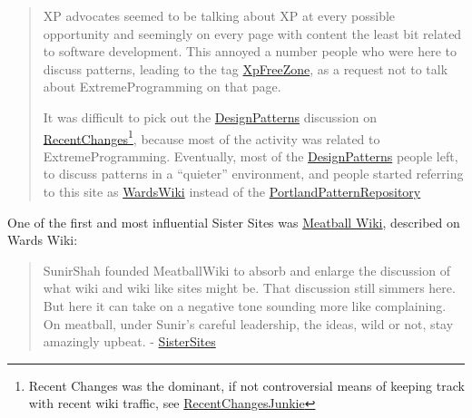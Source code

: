 \documentclass[notoc]{tufte-book}
\begin{document}
\begin{quote}
XP advocates seemed to be talking about XP at every possible opportunity
and seemingly on every page with content the least bit related to
software development. This annoyed a number people who were here to
discuss patterns, leading to the tag
\href{http://wiki.c2.com/?XpFreeZone}{XpFreeZone}, as a request not to
talk about ExtremeProgramming on that page.

It was difficult to pick out the
\href{http://wiki.c2.com/?DesignPatterns}{DesignPatterns} discussion on
\href{http://wiki.c2.com/?RecentChanges}{RecentChanges}\footnote{Recent
  Changes was the dominant, if not controversial means of keeping track
  with recent wiki traffic, see
  \href{http://wiki.c2.com/?RecentChangesJunkie}{RecentChangesJunkie}},
because most of the activity was related to ExtremeProgramming.
Eventually, most of the
\href{http://wiki.c2.com/?DesignPatterns}{DesignPatterns} people left,
to discuss patterns in a ``quieter'' environment, and people started
referring to this site as
\href{http://wiki.c2.com/?WardsWiki}{WardsWiki} instead of the
\href{http://wiki.c2.com/?PortlandPatternRepository}{PortlandPatternRepository}
\citep{C2wikiWikiHistory} 
\end{quote}

One of the first and most influential Sister Sites was
\href{http://meatballwiki.org/}{Meatball Wiki}, described on Wards Wiki:

\begin{quote}
SunirShah founded MeatballWiki to absorb and enlarge the discussion of
what wiki and wiki like sites might be. That discussion still simmers
here. But here it can take on a negative tone sounding more like
complaining. On meatball, under Sunir's careful leadership, the ideas,
wild or not, stay amazingly upbeat. -
\href{http://wiki.c2.com/?SisterSites}{SisterSites}
\end{quote}
\end{document}
